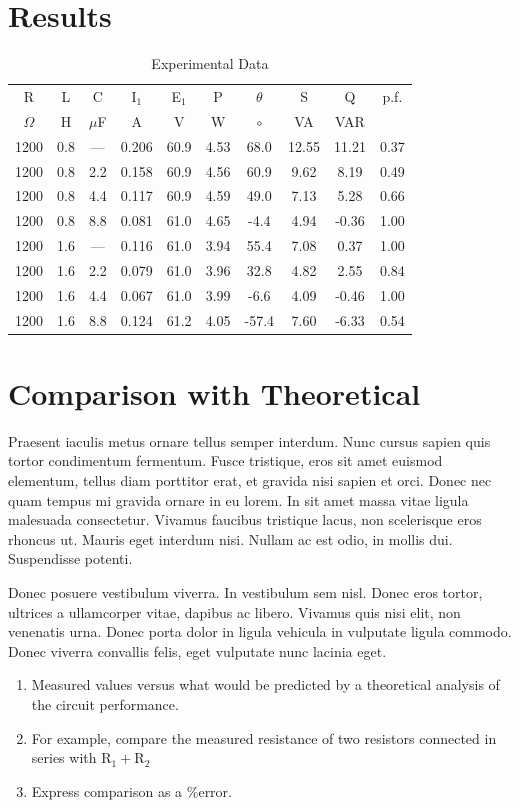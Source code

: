 \documentclass{article}
\begin{document}
\section{Results}
\begin{table}[h]
  \begin{center}
    \begin{tabular}{cccccccccc}
      \hline
      R & L & C & I\(_1\) & E$_1$ & P & \(\theta\) & S & Q & p.f. \\
      \(\Omega\) & H & \(\mu\)F & A & V & W & \(\circ\) & VA & VAR & \\
      \hline
      1200 & 0.8 & --- & 0.206 & 60.9 & 4.53 &  68.0 & 12.55 & 11.21 & 0.37 \\
      1200 & 0.8 & 2.2 & 0.158 & 60.9 & 4.56 &  60.9 &  9.62 &  8.19 & 0.49 \\
      1200 & 0.8 & 4.4 & 0.117 & 60.9 & 4.59 &  49.0 &  7.13 &  5.28 & 0.66 \\
      1200 & 0.8 & 8.8 & 0.081 & 61.0 & 4.65 &  -4.4 &  4.94 & -0.36 & 1.00 \\
      1200 & 1.6 & --- & 0.116 & 61.0 & 3.94 &  55.4 &  7.08 &  0.37 & 1.00 \\
      1200 & 1.6 & 2.2 & 0.079 & 61.0 & 3.96 &  32.8 &  4.82 &  2.55 & 0.84 \\
      1200 & 1.6 & 4.4 & 0.067 & 61.0 & 3.99 &  -6.6 &  4.09 & -0.46 & 1.00 \\
      1200 & 1.6 & 8.8 & 0.124 & 61.2 & 4.05 & -57.4 &  7.60 & -6.33 & 0.54 \\
      \hline
    \end{tabular}
    \caption{Experimental Data}
    \label{meas_dat}
  \end{center}
\end{table}

\section{Comparison with Theoretical}
Praesent iaculis metus ornare tellus semper interdum. Nunc cursus sapien quis
tortor condimentum fermentum. Fusce tristique, eros sit amet euismod elementum,
tellus diam porttitor erat, et gravida nisi sapien et orci. Donec nec quam
tempus mi gravida ornare in eu lorem. In sit amet massa vitae ligula malesuada
consectetur. Vivamus faucibus tristique lacus, non scelerisque eros rhoncus ut.
Mauris eget interdum nisi. Nullam ac est odio, in mollis dui. Suspendisse
potenti.

Donec posuere vestibulum viverra. In vestibulum sem nisl. Donec eros tortor,
ultrices a ullamcorper vitae, dapibus ac libero. Vivamus quis nisi elit, non
venenatis urna. Donec porta dolor in ligula vehicula in vulputate ligula
commodo. Donec viverra convallis felis, eget vulputate nunc lacinia eget. 
\begin{enumerate}{}{}
\item Measured values versus what would be predicted by a theoretical
  analysis of the circuit performance.
\item For example, compare the measured resistance of two resistors connected
  in series with R\(_1 + \)R\(_2\)
\item Express comparison as a \%error.
\end{enumerate}
\end{document}
